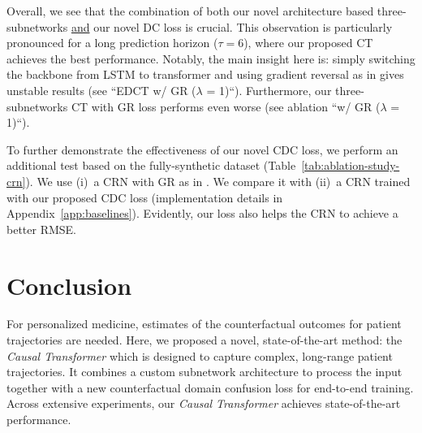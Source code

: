 \documentclass{article}
\theoremstyle{plain}
\theoremstyle{definition}
\theoremstyle{remark}
\newcommand{\longname}{\emph{Causal Transformer}\xspace}
\newcommand{\shortname}{CT\xspace}
\begin{document}
Overall, we see that the combination of both our novel architecture based three-subnetworks \underline{and} our novel DC loss is crucial. This observation is particularly pronounced for a long prediction horizon ($\tau = 6$), where our proposed \shortname achieves the best performance. Notably, the main insight here is: simply switching the backbone from LSTM to transformer and using gradient reversal as in \cite{bica2020estimating} gives unstable results (see ``EDCT w/ GR ($\lambda$ = 1)``). Furthermore, our three-subnetworks \shortname with GR loss performs even worse (see ablation ``w/ GR ($\lambda$ = 1)``). 

To further demonstrate the effectiveness of our novel CDC loss, we perform an additional test based on the fully-synthetic dataset (Table~\ref{tab:ablation-study-crn}). We use (i)~a CRN with GR as in \cite{bica2020estimating}. We compare it with (ii)~a CRN trained with our proposed CDC loss (implementation details in Appendix~\ref{app:baselines}). Evidently, our loss also helps the CRN to achieve a better RMSE.  



\section{Conclusion}

For personalized medicine, estimates of the counterfactual outcomes for patient trajectories are needed. Here, we proposed a novel, state-of-the-art method: the \longname which is designed to capture complex, long-range patient trajectories. It combines a custom subnetwork architecture to process the input together with a new counterfactual domain confusion loss for end-to-end training. Across extensive experiments, our \longname achieves state-of-the-art performance.  





\end{document}
